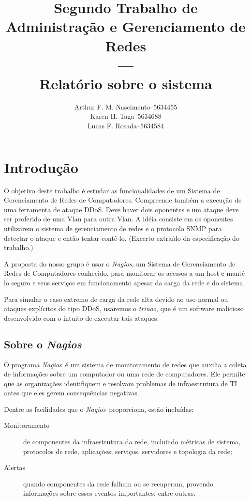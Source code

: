 \documentclass[10pt,a4paper]{article}
\title{Segundo Trabalho de Administração e Gerenciamento de Redes\\---\\Relatório sobre o sistema \Nagios}
\author{
\begin{tabular}{lcr}
Arthur F. M. Nascimento & -- & 5634455\\
Karen H. Taga & -- & 5634688\\
Lucas F. Rosada & -- & 5634584\\
\end{tabular}}
\newcommand{\Nagios}{\textit{Nagios}}
\newcommand{\trinoo}{\textit{trinoo}}
\begin{document}
\maketitle

\tableofcontents


\section{Introdução}

O objetivo deste trabalho é estudar as funcionalidades de um Sistema de Gerenciamento de Redes de
Computadores. Compreende também a execução de uma ferramenta de ataque DDoS. Deve haver dois
oponentes e um ataque deve ser proferido de uma Vlan para outra Vlan. A idéia consiste em os
oponentes utilizarem o sistema de gerenciamento de redes e o protocolo SNMP para detectar o ataque
e então tentar contê-lo. (Excerto extraído da especificação do trabalho.)

A proposta do nosso grupo é usar o \Nagios, um Sistema de Gerenciamento de Redes de Computadores
conhecido, para monitorar os acessos a um host e mantê-lo seguro e seus serviços em funcionamento
apesar da carga da rede e do sistema.

Para simular o caso extremo de carga da rede alta devido ao uso normal ou ataques explícitos do
tipo DDoS, usaremos o \trinoo, que é um software malicioso desenvolvido com o intuito de executar
tais ataques.

\subsection{Sobre o \Nagios}

O programa \Nagios\ é um sistema de monitoramento de redes que auxilia a coleta de informações sobre
um computador ou uma rede de computadores. Ele permite que as organizações identifiquem e resolvam
problemas de infraestrutura de TI antes que eles gerem consequências negativas.

Dentre as facilidades que o \Nagios\ proporciona, estão incluídas:
\begin{description}
	\item[Monitoramento] de componentes da infraestrutura da rede, incluindo métricas de
	sistema, protocolos de rede, aplicações, serviços, servidores e topologia da rede;
	\item[Alertas] quando componentes da rede falham ou se recuperam, provendo informações sobre
	esses eventos importantes; entre outras.
\end{description}
\end{document}
